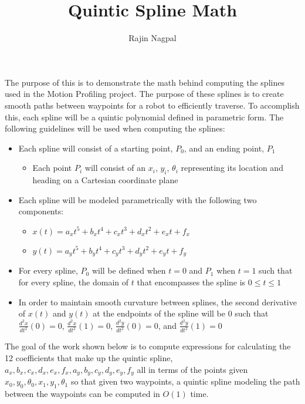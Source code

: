 \documentclass[12pt, letterpaper]{article}
\title{Quintic Spline Math}
\author{Rajin Nagpal}
\begin{document}
\maketitle

The purpose of this is to demonstrate the math behind computing the splines used in the Motion Profiling project. The purpose of these splines is to create smooth paths between waypoints for a robot to efficiently traverse. To accomplish this, each spline will be a quintic polynomial defined in parametric form. The following guidelines will be used when computing the splines: \begin{itemize}
\item Each spline will consist of a starting point, $P_0$, and an ending point, $P_1$ \begin{itemize}
\item Each point $P_i$ will consist of an $x_i$, $y_i$, $\theta_i$ representing its location and heading on a Cartesian coordinate plane
\end{itemize}
\item Each spline will be modeled parametrically with the following two components: \begin{itemize}
\item $x(t) = a_x t^5 + b_x t^4 + c_x t^3 + d_x t^2 + e_x t + f_x$
\item $y(t) = a_y t^5 + b_y t^4 + c_y t^3 + d_y t^2 + e_y t + f_y$
\end{itemize}
\item For every spline, $P_0$ will be defined when $t = 0$ and $P_1$ when $t = 1$ such that for every spline, the domain of $t$ that encompasses the spline is $0 \leq t \leq 1$
\item In order to maintain smooth curvature between splines, the second derivative of $x(t)$ and $y(t)$ at the endpoints of the spline will be $0$ such that $\frac{d^2x}{dt^2} (0) = 0$, $\frac{d^2x}{dt^2} (1) = 0$, $\frac{d^2y}{dt^2} (0) = 0$, and $\frac{d^2y}{dt^2} (1) = 0$
\end{itemize}

The goal of the work shown below is to compute expressions for calculating the 12 coefficients that make up the quintic spline, $a_x, b_x, c_x, d_x, e_x, f_x, a_y, b_y, c_y, d_y, e_y, f_y$ all in terms of the points given $x_0, y_0, \theta_0, x_1, y_1, \theta_1$ so that given two waypoints, a quintic spline modeling the path between the waypoints can be computed in $O(1)$ time.
\end{document}
